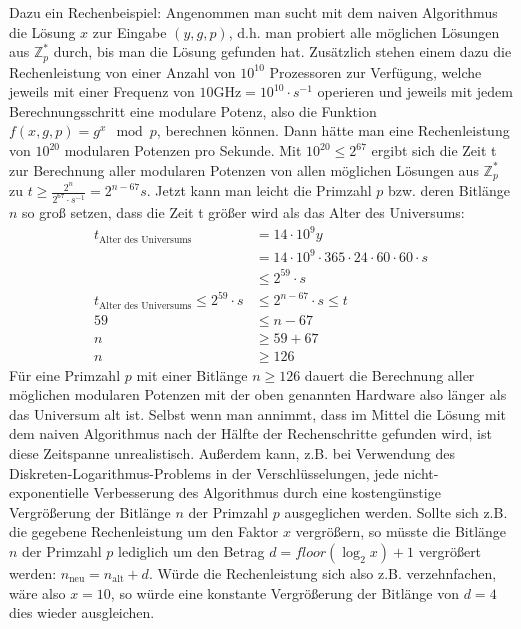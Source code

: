 \documentclass[
  a4paper,
  11pt,
]{scrartcl}
\theoremstyle{plain}
\theoremstyle{definition}
\theoremstyle{remark}
\newcommand{\Z}{\mathbb{Z}}
\begin{document}
Dazu ein Rechenbeispiel: Angenommen man sucht mit dem naiven Algorithmus die Lösung $x$ zur Eingabe $(y,g,p)$, d.h. man probiert alle möglichen Lösungen aus $\Z_p^*$ durch, bis man die Lösung gefunden hat. Zusätzlich stehen einem dazu die Rechenleistung von einer Anzahl von $10^{10}$ Prozessoren zur Verfügung, welche jeweils mit einer Frequenz von $10 \text{GHz} = 10^{10} \cdot s^{-1}$ operieren und jeweils mit jedem Berechnungsschritt eine modulare Potenz, also die Funktion $f(x, g, p) = g^x \mod p$, berechnen können. Dann hätte man eine Rechenleistung von $10^{20}$ modularen Potenzen pro Sekunde. Mit $10^{20} \leq 2^{67}$ ergibt sich die Zeit t zur Berechnung aller modularen Potenzen von allen möglichen Lösungen aus $\Z_p^*$ zu $t\geq \frac{2^n}{2^{67}\cdot s^{-1}}=2^{n-67}s$. Jetzt kann man leicht die Primzahl $p$ bzw. deren Bitlänge $n$ so groß setzen, dass die Zeit t größer wird als das Alter des Universums:
\begin{align*}
    t_{\text{Alter des Universums}} & = 14 \cdot 10^9y \\
    & = 14 \cdot 10^9 \cdot 365 \cdot 24 \cdot 60\cdot 60\cdot s\\
    & \leq 2^{59}\cdot s\\
    t_{\text{Alter des Universums}} \leq 2^{59}\cdot s & \leq 2^{n-67}\cdot s \leq t \\
    59 & \leq n-67\\
    n & \geq 59+67\\
    n & \geq 126
\end{align*}
Für eine Primzahl $p$ mit einer Bitlänge $n \geq 126$ dauert die Berechnung aller möglichen modularen Potenzen mit der oben genannten Hardware also länger als das Universum alt ist. Selbst wenn man annimmt, dass im Mittel die Lösung mit dem naiven Algorithmus nach der Hälfte der Rechenschritte gefunden wird, ist diese Zeitspanne unrealistisch. Außerdem kann, z.B. bei Verwendung des Diskreten-Logarithmus-Problems in der Verschlüsselungen, jede nicht-exponentielle Verbesserung des Algorithmus durch eine kostengünstige Vergrößerung der Bitlänge $n$ der Primzahl $p$ ausgeglichen werden. Sollte sich z.B. die gegebene Rechenleistung um den Faktor $x$ vergrößern, so müsste die Bitlänge $n$ der Primzahl $p$ lediglich um den Betrag $d = floor(\log_2 x)+1$ vergrößert werden: $n_{\text{neu}} = n_{\text{alt}} + d$. Würde die Rechenleistung sich also z.B. verzehnfachen, wäre also $x=10$, so würde eine konstante Vergrößerung der Bitlänge von $d=4$ dies wieder ausgleichen.
\end{document}
